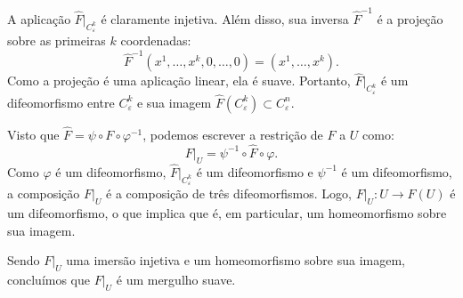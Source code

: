 {	A aplicação $\hat{F}|_{C_\varepsilon^k}$ é claramente injetiva. Além disso, sua inversa $\hat{F}^{-1}$ é a projeção sobre as primeiras $k$ coordenadas:
	\begin{equation*}
		\hat{F}^{-1}(x^1, \dots, x^k, 0, \dots, 0) = (x^1, \dots, x^k).
	\end{equation*}
	Como a projeção é uma aplicação linear, ela é suave. Portanto, $\hat{F}|_{C_\varepsilon^k}$ é um difeomorfismo entre $C_\varepsilon^k$ e sua imagem $\hat{F}(C_\varepsilon^k) \subset C_\varepsilon^n$.
	
	Visto que $\hat{F} = \psi \circ F \circ \varphi^{-1}$, podemos escrever a restrição de $F$ a $U$ como:
	\begin{equation*}
		F|_U = \psi^{-1} \circ \hat{F} \circ \varphi.
	\end{equation*}
	Como $\varphi$ é um difeomorfismo, $\hat{F}|_{C_\varepsilon^k}$ é um difeomorfismo e $\psi^{-1}$ é um difeomorfismo, a composição $F|_U$ é a composição de três difeomorfismos. Logo, $F|_U : U \to F(U)$ é um difeomorfismo, o que implica que é, em particular, um homeomorfismo sobre sua imagem.
	
	Sendo $F|_U$ uma imersão injetiva e um homeomorfismo sobre sua imagem, concluímos que $F|_U$ é um mergulho suave.
}



